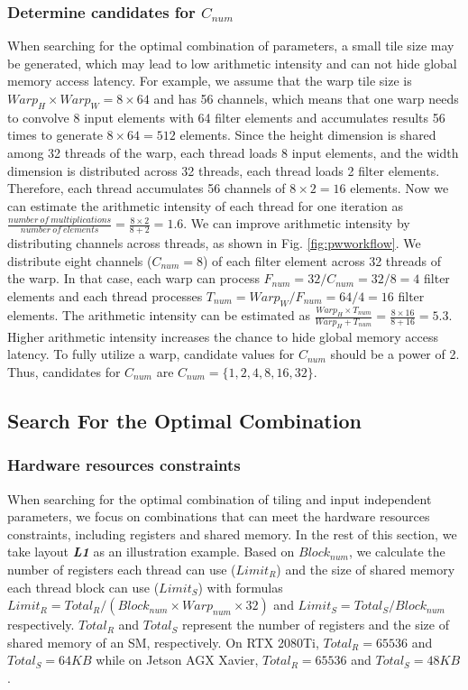 \subsubsection{Determine candidates for $C_{num}$\label{sec:cnum}} 
When searching for the optimal combination of parameters, a small tile size may be generated, which may lead to low arithmetic intensity and can not hide global memory access latency.
 For example, we assume that the warp tile size is $Warp_H \times Warp_W = 8 \times 64$ and has 56 channels, which means that one warp needs to convolve 8 input elements with 64 filter elements and accumulates results 56 times to generate $8 \times 64=512$ elements. Since the height dimension is shared among 32 threads of the warp, each thread loads 8 input elements, and the width dimension is distributed across 32 threads, each thread loads 2 filter elements. Therefore, each thread accumulates 56 channels of $8 \times 2=16$ elements. Now we can estimate the arithmetic intensity of each thread for one iteration as $\frac{number\ of\ multiplications}{number\ of\ elements}=\frac{8 \times 2}{8 + 2}=1.6$. We can improve arithmetic intensity by distributing channels across threads, as shown in Fig. \ref{fig:pwworkflow}. We distribute eight channels ($C_{num}=8$) of each filter element across 32 threads of the warp.
 In that case, each warp can process $F_{num}=32/C_{num}=32/8=4$ filter elements and each thread processes $T_{num}=Warp_W/F_{num}=64/4=16$ filter elements.
 The arithmetic intensity can be estimated as $\frac{Warp_H \times T_{num}}{Warp_H + T_{num}}=\frac{8 \times 16}{8+16}=5.3$.
 Higher arithmetic intensity increases the chance to hide global memory access latency.
To fully utilize a warp, candidate values for $C_{num}$ should be a power of 2.
Thus, candidates for $C_{num}$ are $C_{num}=\{1,2,4,8,16,32\}$.


\subsection{Search For the Optimal Combination}
\subsubsection{Hardware resources constraints}
When searching for the optimal combination of tiling and input independent parameters, we focus on combinations that can meet the hardware resources constraints,
including registers and shared memory. In the rest of this section, we take layout \textbf{\emph{L1}} as an illustration example. Based on
$Block_{num}$, we calculate the number of registers each thread can use ($Limit_R$) and the size of shared memory each thread block can use
($Limit_S$) with formulas $Limit_R=Total_R/(Block_{num}\times Warp_{num} \times 32)$ and $Limit_S=Total_S/Block_{num}$ respectively.
$Total_R$ and $Total_S$ represent the number of registers and the size of shared memory of an SM, respectively. On RTX 2080Ti,
$Total_R=65536$ and $Total_S=64KB$ while  on Jetson AGX Xavier, $Total_R=65536$ and $Total_S=48KB$.

